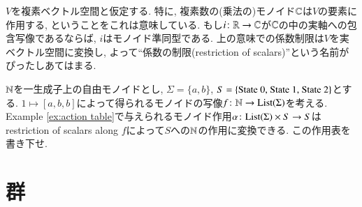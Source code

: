 \begin{example}


$V$を複素ベクトル空間と仮定する. 特に, 複素数の(乗法の)モノイド${\mathbb C}$は$V$の要素に作用する, ということをこれは意味している. もし$i\colon{\mathbb R}\rightarrow{\mathbb C}$が${\mathbb C}$の中の実軸への包含写像であるならば, $i$はモノイド準同型である. 上の意味での係数制限は$V$を実ベクトル空間に変換し, よって``係数の制限(restriction of scalars)''という名前がぴったしあてはまる.

\end{example}

\begin{exercise}
${\mathbb N}$を一生成子上の自由モノイドとし, $\Sigma=\{a,b\}$, $S=\{\tn{State 0, State 1, State 2}\}$とする. $1\mapsto [a,b,b]$によって得られるモノイドの写像$f\taking\NN\to\List(\Sigma)$を考える. Example \ref{ex:action table}で与えられるモノイド作用$\alpha\taking\List(\Sigma)\times S\to S$はrestriction of scalars along $f$によって$S$への${\mathbb N}$の作用に変換できる. この作用表を書き下せ.
\end{exercise}




\section{群}\label{sec:groups}


